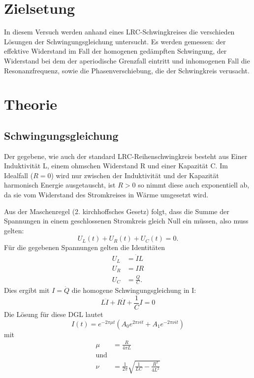 \documentclass{scrartcl}
\begin{document}
    \section{Zielsetung}
    In diesem Versuch werden anhand eines LRC-Schwingkreises die verschieden Lösungen der Schwingungsgleichung untersucht.
    Es werden gemessen: der effektive Widerstand im Fall der homogenen gedämpften Schwingung,
    der Widerstand bei dem der aperiodische Grenzfall eintritt und inhomogenen Fall die Resonanzfrequenz, sowie die Phasenverschiebung,
    die der Schwingkreis verusacht.


    \section{Theorie}
    \subsection{Schwingungsgleichung}
    \label{sub:Schwingungsgleichung}

    \label{sec:Theorie}
    Der gegebene, wie auch der standard LRC-Reihenschwingkreis besteht aus Einer Induktivität L, einem ohmschen Widerstand R und einer Kapazität C.
    Im Idealfall ($R=0$) wird nur zwischen der Induktivität und der Kapazität harmonisch Energie ausgetauscht, ist $R > 0$ so nimmt diese auch exponentiell ab,
    da sie vom Widerstand des Stromkreises in Wärme umgesetzt wird.

    Aus der Maschenregel (2. kirchhoffsches Gesetz) folgt, dass die Summe der Spannungen in einem geschlossenen Stromkreis gleich Null ein müssen, also muss gelten:
    \begin{equation}
        U_L(t)+U_R(t)+U_C(t)=0.
        \label{eqn:Krichhoff2}
    \end{equation}
    Für die gegebenen Spannungen gelten die Identitäten
    \begin{align*}
        U_L &= \dot{I}L \\
        U_R &= IR  \\
        U_C &= \frac{Q}{C}.
    \end{align*}
    Dies ergibt mit $I=\dot{Q}$ die homogene Schwingungsgleichung in I:
    \begin{equation}
        L\ddot{I}+R\dot{I}+\frac{1}{C}I=0
        \label{eqn:Schwingungsgleichung}
    \end{equation}
    Die Lösung für diese DGL lautet
    \begin{equation}
        I(t)=e^{-2\pi\mu t}(A_0e^{2\pi\nu it}+A_1e^{-2\pi\nu it})
        \label{eqn:Fundamentalsys}
    \end{equation}
    mit
    \begin{align}
        \mu &= \frac{R}{4\pi L}\\
        \text{und}\\
        \nu &= \frac{1}{2\pi}\sqrt{\frac{1}{LC}-\frac{R^2}{4L^2}}
    \end{align}
\end{document}
